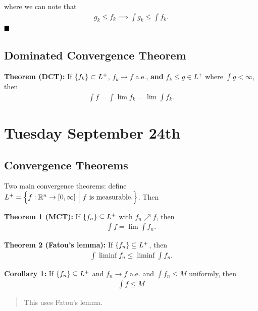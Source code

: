 where we can note that
\begin{align*}
g_k \leq f_k \implies \int g_k \leq \int f_k
.\end{align*} \(\qed\)

\hypertarget{dominated-convergence-theorem}{%
\subsection{Dominated Convergence
Theorem}\label{dominated-convergence-theorem}}

\textbf{Theorem (DCT):} If \(\left\{{f_k}\right\} \subset L^+\), \(f_k \to f\)
a.e., \textbf{and} \(f_k \leq g \in L^+\) where \(\int g < \infty\),
then
\begin{align*}
\int f = \int \lim f_k = \lim \int f_k
.\end{align*}

\hypertarget{tuesday-september-24th}{%
\section{Tuesday September 24th}\label{tuesday-september-24th}}

\hypertarget{convergence-theorems}{%
\subsection{Convergence Theorems}\label{convergence-theorems}}

Two main convergence theorems: define
\(L^+ = \left\{{f: {\mathbb{R}}^n \to [0, \infty] {~\mathrel{\Big|}~} f\text{ is measurable.}}\right\}\).
Then

\textbf{Theorem 1 (MCT):} If \(\left\{{f_n}\right\} \subseteq L^+\) with
\(f_n \nearrow f\), then
\begin{align*}
\int f = \lim \int f_n.\end{align*}

\textbf{Theorem 2 (Fatou's lemma):} If \(\left\{{f_n}\right\} \subseteq L^+\),
then
\begin{align*}
\int \liminf f_n \leq \liminf \int f_n.
\end{align*}

\textbf{Corollary 1:} If \(\left\{{f_n}\right\} \subseteq L^+\) and
\(f_n \to f\) a.e. and \(\int f_n \leq M\) uniformly, then
\begin{align*}
\int f \leq M
\end{align*}

\begin{quote}
This uses Fatou's lemma.
\end{quote}

